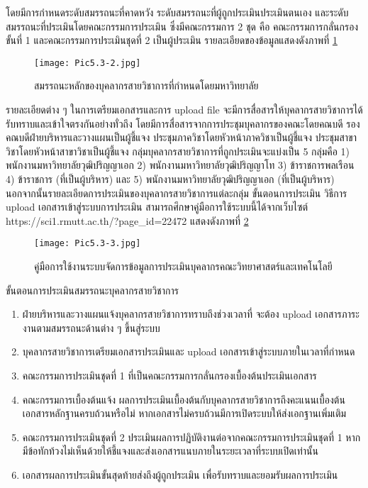 โดยมีการกำหนดระดับสมรรถนะที่คาดหวัง ระดับสมรรถนะที่ผู้ถูกประเมินประเมินตนเอง และระดับสมรรถนะที่ประเมินโดยคณะกรรมการประเมิน ซึ่งมีคณะกรรมการ 2 ชุด คือ คณะกรรมการกลั่นกรองขั้นที่ 1 และคณะกรรมการประเมินชุดที่ 2 เป็นผู้ประเมิน รายละเอียดของข้อมูลแสดงดังภาพที่ \ref{Pic5.3-2}
\begin{figure}[h!]
	\texttt{[image: Pic5.3-2.jpg]}
	\caption{สมรรถนะหลักของบุคลากรสายวิชาการที่กำหนดโดยมหาวิทยาลัย}
	\label{Pic5.3-2}
\end{figure}
รายละเอียดต่าง ๆ ในการเตรียมเอกสารและการ upload file จะมีการสื่อสารให้บุคลากรสายวิชาการได้รับทราบและเข้าใจตรงกันอย่างทั่วถึง โดยมีการสื่อสารจากการประชุมบุคลากรของคณะโดยคณบดี รองคณบดีฝ่ายบริหารและวางแผนเป็นผู้ชี้แจง ประชุมภาควิชาโดยหัวหน้าภาควิชาเป็นผู้ชี้แจง ประชุมสาขาวิชาโดยหัวหน้าสาขาวิชาเป็นผู้ชี้แจง กลุ่มบุคลากรสายวิชาการที่ถูกประเมินจะแบ่งเป็น 5 กลุ่มคือ 1) พนักงานมหาวิทยาลัยวุฒิปริญญาเอก 2) พนักงานมหาวิทยาลัยวุฒิปริญญาโท 3) ข้าราชการพลเรือน 4) ข้าราชการ (ที่เป็นผู้บริหาร) และ 5) พนักงานมหาวิทยาลัยวุฒิปริญญาเอก (ที่เป็นผู้บริหาร) นอกจากนั้นรายละเอียดการประเมินของบุคลากรสายวิชาการแต่ละกลุ่ม ขั้นตอนการประเมิน วิธีการ upload เอกสารเข้าสู่ระบบการประเมิน สามารถศึกษาคู่มือการใช้ระบบนี้ได้จากเว็บไซต์  https://sci1.rmutt.ac.th/?page\_id=22472  แสดงดังภาพที่ \ref{Pic5.3-3}\newpage

\begin{figure}[h!]
	\texttt{[image: Pic5.3-3.jpg]}
	\caption{คู่มือการใช้งานระบบจัดการข้อมูลการประเมินบุคลากรคณะวิทยาศาสตร์และเทคโนโลยี}
	\label{Pic5.3-3}
\end{figure}
\noindent
ขั้นตอนการประเมินสมรรถนะบุคลากรสายวิชาการ
\begin{enumerate}
\item ฝ่ายบริหารและวางแผนแจ้งบุคลากรสายวิชาการทราบถึงช่วงเวลาที่ จะต้อง upload เอกสารภาระงานตามสมรรถนะด้านต่าง ๆ ขึ้นสู่ระบบ 
\item บุคลากรสายวิชาการเตรียมเอกสารประเมินและ upload เอกสารเข้าสู่ระบบภายในเวลาที่กำหนด
\item คณะกรรมการประเมินชุดที่ 1 ที่เป็นคณะกรรมการกลั่นกรองเบื้องต้นประเมินเอกสาร 
\item คณะกรรมการเบื้องต้นแจ้ง ผลการประเมินเบื้องต้นกับบุคลากรสายวิชาการถึงคะแนนเบื้องต้น เอกสารหลักฐานครบถ้วนหรือไม่ หากเอกสารไม่ครบถ้วนมีการเปิดระบบให้ส่งเอกฐานเพิ่มเติม
\item คณะกรรมการประเมินชุดที่ 2 ประเมินผลการปฏิบัติงานต่อจากคณะกรรมการประเมินชุดที่ 1 หากมีข้อทักท้วงไม่เห็นด้วยให้ชี้แจงและส่งเอกสารแนบภายในระยะเวลาที่ระบบเปิดเท่านั้น
\item เอกสารผลการประเมินขั้นสุดท้ายส่งถึงผู้ถูกประเมิน เพื่อรับทราบและยอมรับผลการประเมิน
\end{enumerate}

